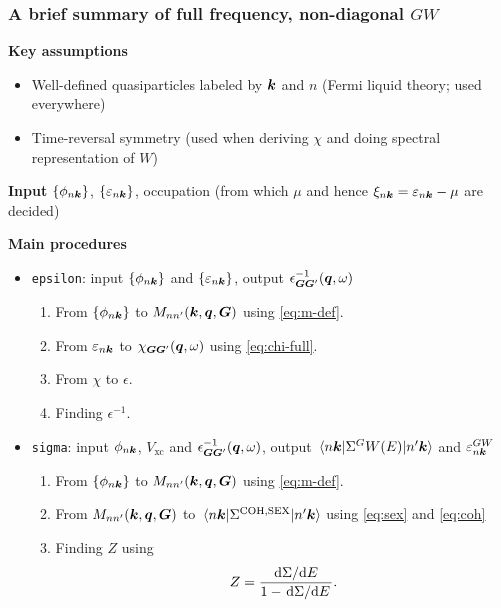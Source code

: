 \documentclass[t]{beamer}
\newcommand{\shortcode}[1]{\texttt{#1}}
\begin{document}
\begin{frame}[allowframebreaks]
\frametitle{A brief summary of full frequency, non-diagonal $GW$}

\textbf{Key assumptions} \begin{itemize}
    \item Well-defined quasiparticles labeled by $\vb*{k}$ and $n$
    (Fermi liquid theory; used everywhere)
    \item Time-reversal symmetry (used when deriving $\chi$ and doing spectral representation of $W$)
\end{itemize}

\textbf{Input} $\{\phi_{n \vb*{k}}\}$, $\{\varepsilon_{n \vb*{k}}\}$, 
occupation (from which $\mu$ and hence $\xi_{n \vb*{k}} = \varepsilon_{n \vb*{k}} - \mu$
are decided)

\textbf{Main procedures} \begin{itemize}
    \item \shortcode{epsilon}: input $\{\phi_{n \vb*{k}}\}$ and $\{\varepsilon_{n \vb*{k}}\}$, 
    output $\epsilon^{-1}_{\vb*{G} \vb*{G}'}(\vb*{q}, \omega)$
    \begin{enumerate}
        \item From $\{\phi_{n \vb*{k}}\}$ 
        to $M_{n n'}(\vb*{k}, \vb*{q}, \vb*{G})$ using \eqref{eq:m-def}.
        \item From $\varepsilon_{n \vb*{k}}$ to $\chi_{\vb*{G} \vb*{G}'}(\vb*{q}, \omega)$ using \eqref{eq:chi-full}.
        \item From $\chi$ to $\epsilon$.
        \item Finding $\epsilon^{-1}$.
    \end{enumerate}

    \item \shortcode{sigma}: input $\phi_{n \vb*{k}}$, $V_{\text{xc}}$ and $\epsilon^{-1}_{\vb*{G} \vb*{G}'}(\vb*{q}, \omega)$,
    output $\mel{n \vb*{k}}{\Sigma^GW(E)}{n' \vb*{k}}$ and $\varepsilon_{n \vb*{k}}^{GW}$ 
    \begin{enumerate}
        \item From $\{\phi_{n \vb*{k}}\}$ 
        to $M_{n n'}(\vb*{k}, \vb*{q}, \vb*{G})$ using \eqref{eq:m-def}.
        \item From $M_{n n'}(\vb*{k}, \vb*{q}, \vb*{G})$ to 
        $\mel{n \vb*{k}}{\Sigma^{\text{COH}, \text{SEX}}}{n' \vb*{k}}$
        using \eqref{eq:sex} and \eqref{eq:coh}
        \item Finding $Z$ using 
        \begin{equation}
            Z = \frac{\dv*{\Sigma}{E}}{1 - \dv*{\Sigma}{E}}.
        \end{equation}
    \end{enumerate}
\end{itemize}


\end{frame}
\end{document}
